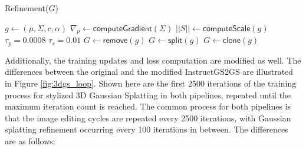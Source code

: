 \begin{algorithm}
	\caption{Refinement($G$)} \label{alg:Refinement}

	\begin{algorithmic}
		\State $g \gets (\mu ,\Sigma ,c,\alpha )$
		\State $\nabla_p \gets \mathsf{computeGradient}(\Sigma)$
		\State $||S|| \gets \mathsf{computeScale}(g)$
		\State $\tau_p =  0.0008$ 
		\State $\tau_s =  0.01$ 
		 
		\State $G \gets \mathsf{remove}(g)$
		\EndIf
		 
		 
		\State $G \gets \mathsf{split}(g)$
		\Else {}
		\State $G \gets \mathsf{clone}(g)$
		\EndIf
		\EndIf
		\EndFor

	\end{algorithmic}
\end{algorithm}



Additionally, the training updates and loss computation are modified as well. The differences between the original and the modified InstructGS2GS are illustrated in Figure \ref{fig:3dgs_loop}. Shown here are the first 2500 iterations of the training process for stylized 3D Gaussian Splatting in both pipelines, repeated until the maximum iteration count is reached. The common process for both pipelines is that the image editing cycles are repeated every 2500 iterations, with Gaussian splatting refinement occurring every 100 iterations in between. The differences are as follows:

